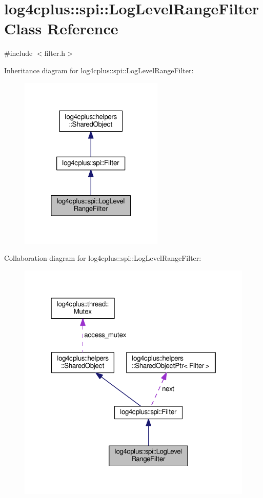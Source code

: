 \hypertarget{classlog4cplus_1_1spi_1_1LogLevelRangeFilter}{\section{log4cplus\-:\-:spi\-:\-:Log\-Level\-Range\-Filter Class Reference}
\label{classlog4cplus_1_1spi_1_1LogLevelRangeFilter}
}


{\ttfamily \#include $<$filter.\-h$>$}



Inheritance diagram for log4cplus\-:\-:spi\-:\-:Log\-Level\-Range\-Filter\-:
\nopagebreak
\begin{figure}[H]
\begin{center}
\leavevmode
\includegraphics[width=194pt]{classlog4cplus_1_1spi_1_1LogLevelRangeFilter__inherit__graph}
\end{center}
\end{figure}


Collaboration diagram for log4cplus\-:\-:spi\-:\-:Log\-Level\-Range\-Filter\-:
\nopagebreak
\begin{figure}[H]
\begin{center}
\leavevmode
\includegraphics[width=321pt]{classlog4cplus_1_1spi_1_1LogLevelRangeFilter__coll__graph}
\end{center}
\end{figure}
